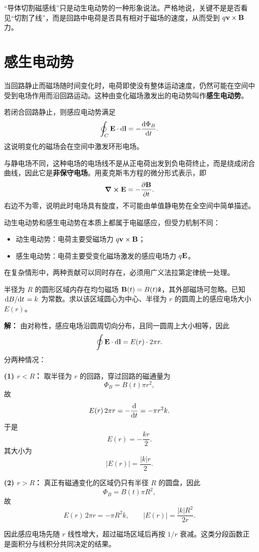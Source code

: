 \begin{remark}
“导体切割磁感线”只是动生电动势的一种形象说法。严格地说，关键不是是否看见“切割了线”，而是回路中电荷是否具有相对于磁场的速度，从而受到 $q\vb{v}\times\vb{B}$ 力。
\end{remark}

\section{感生电动势}

当回路静止而磁场随时间变化时，电荷即使没有整体运动速度，仍然可能在空间中受到电场作用而沿回路运动。这种由变化磁场激发出的电动势叫作\textbf{感生电动势}。

\begin{law}[变化磁场产生电场]
若闭合回路静止，则感应电动势满足
\[
\oint_C \vb{E}\cdot \dd \vb{l}=-\dv{\Phi_B}{t}.
\]
这说明变化的磁场会在空间中激发环形电场。
\end{law}

与静电场不同，这种电场的电场线不是从正电荷出发到负电荷终止，而是绕成闭合曲线，因此它是\textbf{非保守电场}。用麦克斯韦方程的微分形式表示，即
\[
\curl \vb{E}=-\pdv{\vb{B}}{t}.
\]
右边不为零，说明此时电场具有旋度，不可能由单值静电势在全空间中简单描述。

\begin{remark}
动生电动势和感生电动势在本质上都属于电磁感应，但受力机制不同：
\begin{itemize}
  \item 动生电动势：电荷主要受磁场力 $q\vb{v}\times\vb{B}$；
  \item 感生电动势：电荷主要受变化磁场激发的感应电场力 $q\vb{E}$。
\end{itemize}
在复杂情形中，两种贡献可以同时存在，必须用广义法拉第定律统一处理。
\end{remark}

\begin{example}
半径为 $R$ 的圆形区域内存在均匀磁场 $\vb{B}(t)=B(t)\vu{z}$，其外部磁场可忽略。已知 $\dv*{B}{t}=k$ 为常数。求以该区域圆心为中心、半径为 $r$ 的圆周上的感应电场大小 $E(r)$。

\textbf{解：} 由对称性，感应电场沿圆周切向分布，且同一圆周上大小相等，因此
\[
\oint \vb{E}\cdot \dd \vb{l}=E(r)\cdot 2\pi r.
\]
分两种情况：

\textbf{(1) $r<R$：} 取半径为 $r$ 的回路，穿过回路的磁通量为
\[
\Phi_B=B(t)\pi r^2,
\]
故
\[
E(r)\,2\pi r=-\dv{}{t}(B\pi r^2)=-\pi r^2 k.
\]
于是
\[
E(r)=-\frac{k r}{2}.
\]
其大小为
\[
|E(r)|=\frac{|k|r}{2}.
\]

\textbf{(2) $r>R$：} 真正有磁通变化的区域仍只有半径 $R$ 的圆盘，因此
\[
\Phi_B=B(t)\pi R^2,
\]
故
\[
E(r)\,2\pi r=-\pi R^2 k,
\qquad
|E(r)|=\frac{|k|R^2}{2r}.
\]

因此感应电场先随 $r$ 线性增大，超过磁场区域后再按 $1/r$ 衰减。这类分段函数正是面积分与线积分共同决定的结果。
\end{example}

